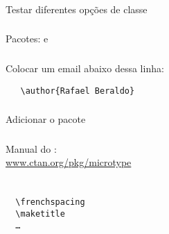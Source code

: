 \begin{frame}
  \frametitle{}
  \Huge
  Testar diferentes opções de classe
\end{frame}

\begin{frame}
  \frametitle{}
  \Huge
  Pacotes:  e 
\end{frame}

\begin{frame}[fragile]
  \frametitle{}
  \LARGE
  Colocar um email abaixo dessa linha:
  \begin{verbatim}
   \author{Rafael Beraldo}
  \end{verbatim}
\end{frame}

\begin{frame}
  \frametitle{}
  \Huge
  Adicionar o pacote 
\end{frame}

\begin{frame}
  \frametitle{}
  \LARGE
  Manual do :\\
  \url{www.ctan.org/pkg/microtype}
\end{frame}

\begin{frame}[fragile]
  \frametitle{}
  \begin{verbatim}
  
  \frenchspacing
  \maketitle
  …
  
  \end{verbatim}
\end{frame}

